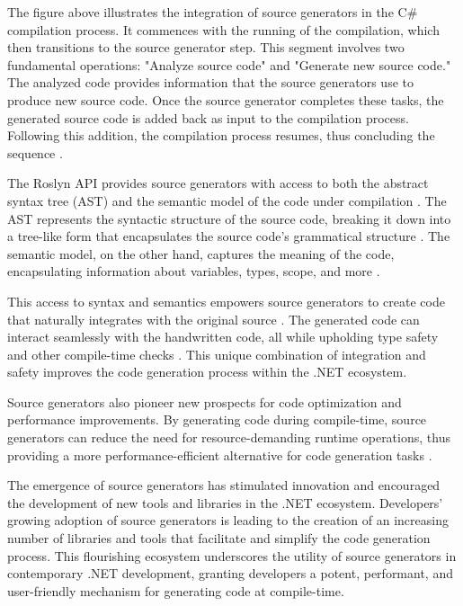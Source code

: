 The figure above illustrates the integration of source generators in the C\# compilation process. It commences with the running of the compilation, which then transitions to the source generator step. This segment involves two fundamental operations: "Analyze source code" and "Generate new source code." The analyzed code provides information that the source generators use to produce new source code. Once the source generator completes these tasks, the generated source code is added back as input to the compilation process. Following this addition, the compilation process resumes, thus concluding the sequence \cite{CSharpRoslyn}.

The Roslyn API provides source generators with access to both the abstract syntax tree (AST) and the semantic model of the code under compilation \cite{CSharpRoslyn}. The AST represents the syntactic structure of the source code, breaking it down into a tree-like form that encapsulates the source code's grammatical structure \cite{CSharpRoslyn}. The semantic model, on the other hand, captures the meaning of the code, encapsulating information about variables, types, scope, and more \cite{CSharpRoslyn}.

This access to syntax and semantics empowers source generators to create code that naturally integrates with the original source \cite{CSharpRoslyn}. The generated code can interact seamlessly with the handwritten code, all while upholding type safety and other compile-time checks \cite{Carter2020}. This unique combination of integration and safety improves the code generation process within the .NET ecosystem.

Source generators also pioneer new prospects for code optimization and performance improvements. By generating code during compile-time, source generators can reduce the need for resource-demanding runtime operations, thus providing a more performance-efficient alternative for code generation tasks \cite{CSharpRoslyn}.

The emergence of source generators has stimulated innovation and encouraged the development of new tools and libraries in the .NET ecosystem. Developers' growing adoption of source generators is leading to the creation of an increasing number of libraries and tools that facilitate and simplify the code generation process. This flourishing ecosystem underscores the utility of source generators in contemporary .NET development, granting developers a potent, performant, and user-friendly mechanism for generating code at compile-time.

